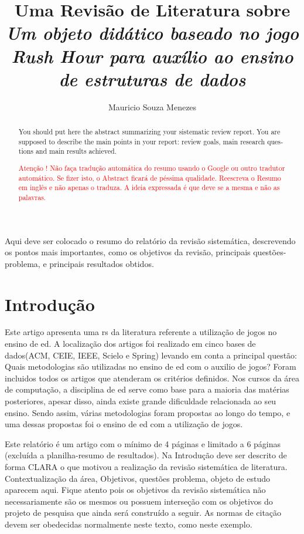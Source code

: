 \documentclass[12pt]{article}
\title{Uma Revisão de Literatura sobre \textit{Um objeto didático baseado no jogo Rush Hour para auxílio ao ensino de estruturas de dados}}
\author{Mauricio Souza Menezes\\}
\begin{document}

\maketitle

\begin{resumo}
    Aqui deve ser colocado o resumo do relatório da revisão sistemática, descrevendo os pontos mais importantes, como os objetivos da revisão, principais questões-problema, e principais resultados obtidos.
\end{resumo}


\begin{abstract}
\begin{otherlanguage}{english}
    You should put here the abstract summarizing your sistematic review report. You are supposed to describe the main points in your report: review goals, main research questions and main results achieved. 
\end{otherlanguage} \textcolor{red}{Atenção ! Não faça tradução automática do resumo usando o Google ou outro tradutor automático. Se fizer isto, o Abstract ficará de péssima qualidade. Reescreva o Resumo em inglês e não apenas o traduza. A ideia expressada é que deve se a mesma e não as palavras.}
\end{abstract}


\section{Introdução}
Este artigo apresenta uma \gls{rs} da literatura referente a utilização de jogos no ensino de \gls{ed}. A localização dos artigos foi realizado em cinco bases de dados(ACM, CEIE, IEEE, Scielo e Spring) levando em conta a principal questão: Quais metodologias são utilizadas no ensino de \gls{ed} com o auxilio de jogos? Foram incluidos todos os artigos que atenderam os critérios definidos.
Nos cursos da área de computação, a disciplina de \gls{ed} serve como base para a maioria das matérias posteriores, apesar disso, ainda existe grande dificuldade relacionada ao seu ensino. Sendo assim, várias metodologias foram propostas ao longo do tempo, e uma dessas propostas foi o ensino de \gls{ed} com a utilização de jogos.

Este relatório é um artigo com o mínimo de 4 páginas e limitado a 6 páginas (excluída a planilha-resumo de resultados). Na Introdução deve ser descrito de forma CLARA o que motivou a realização da revisão sistemática de literatura. Contextualização da área, Objetivos, questões problema, objeto de estudo aparecem aqui. Fique atento pois os objetivos da revisão sistemática não necessariamente são os mesmos ou possuem interseção com os objetivos do projeto de pesquisa que ainda será construído a seguir. As normas de citação devem ser obedecidas normalmente neste texto, como neste exemplo\cite{Sunikova2018}.
\end{document}
